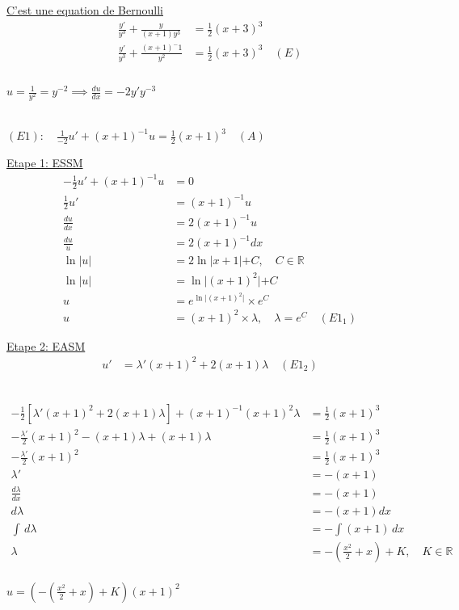 \underline{C'est une equation de Bernoulli}
\begin{align*}
	\frac {y'}{y^3} + \frac{y}{(x+1)y^3} &= \frac{1}{2}(x+3)^3 \\
	\frac {y'}{y^3} + \frac{(x+1)^-1}{y^2} &= \frac{1}{2}(x+3)^3 \quad (E)\\ 
\end{align*}
 \\
$u = \frac{1}{y^2} = y^{-2} \implies \frac{du}{dx} = -2y'y^{-3}$

 \\ 
$(E1): \quad \frac{1}{-2}u' + (x+1)^{-1}u = \frac{1}{2}(x+1)^3 \quad (A)$

\underline{Etape 1: ESSM}
\begin{align}
	-\frac{1}{2}u' + (x+1)^{-1}u &= 0 \\
	\frac{1}{2}u' &= (x+1)^{-1}u \\
	\frac{du}{dx} &= 2(x+1)^{-1}u \\
	\frac{du}{u} &= 2(x+1)^{-1}dx \\
	\ln \lvert u \lvert &= 2 \ln \lvert x+1 \lvert + C, \quad C \in \mathbb{R} \\	
	\ln \lvert u \lvert &= \ln \lvert (x+1)^2 \lvert + C \\
	u &= e^{\ln \lvert (x+1)^2 \lvert} \times e^{C} \\
	u &= (x+1)^2 \times \lambda, \quad \lambda = e^{C} \quad (E1_1)
\end{align}

\underline{Etape 2: EASM}
\begin{align*}
	u' &= \lambda'(x+1)^2 + 2(x+1) \lambda \quad (E1_2)
\end{align*}

 \\
\begin{align*}
	-\frac{1}{2}[\lambda'(x+1)^2 + 2(x+1)\lambda] + (x+1)^{-1}(x+1)^2\lambda &= \frac{1}{2}(x+1)^3 \\
	-\frac{\lambda'}{2} (x+1)^2 - (x+1)\lambda + (x+1)\lambda &= \frac{1}{2}(x+1)^3 \\
	- \frac{\lambda'}{2} (x+1)^2 &= \frac{1}{2}(x+1)^3 \\
	\lambda' &= - (x+1) \\
	\frac{d\lambda}{dx}	 &= -(x+1) \\
	d\lambda &= -(x+1) dx \\
	\int \, d\lambda &= - \int (x+1) \, dx \\
	\lambda &= - (\frac{x^2}{2} + x) + K, \quad K \in \mathbb{R} \\	
\end{align*}

$u = (- (\frac{x^2}{2} + x) + K) (x+1)^2$